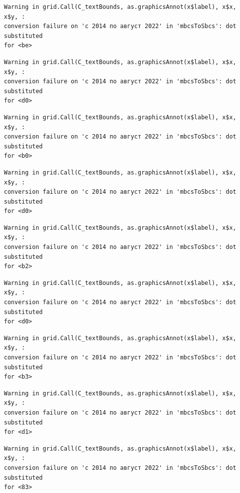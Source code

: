 \documentclass[
  letterpaper,
  DIV=11,
  numbers=noendperiod]{scrartcl}
\begin{document}
\begin{verbatim}
Warning in grid.Call(C_textBounds, as.graphicsAnnot(x$label), x$x, x$y, :
conversion failure on 'с 2014 по август 2022' in 'mbcsToSbcs': dot substituted
for <be>
\end{verbatim}

\begin{verbatim}
Warning in grid.Call(C_textBounds, as.graphicsAnnot(x$label), x$x, x$y, :
conversion failure on 'с 2014 по август 2022' in 'mbcsToSbcs': dot substituted
for <d0>
\end{verbatim}

\begin{verbatim}
Warning in grid.Call(C_textBounds, as.graphicsAnnot(x$label), x$x, x$y, :
conversion failure on 'с 2014 по август 2022' in 'mbcsToSbcs': dot substituted
for <b0>
\end{verbatim}

\begin{verbatim}
Warning in grid.Call(C_textBounds, as.graphicsAnnot(x$label), x$x, x$y, :
conversion failure on 'с 2014 по август 2022' in 'mbcsToSbcs': dot substituted
for <d0>
\end{verbatim}

\begin{verbatim}
Warning in grid.Call(C_textBounds, as.graphicsAnnot(x$label), x$x, x$y, :
conversion failure on 'с 2014 по август 2022' in 'mbcsToSbcs': dot substituted
for <b2>
\end{verbatim}

\begin{verbatim}
Warning in grid.Call(C_textBounds, as.graphicsAnnot(x$label), x$x, x$y, :
conversion failure on 'с 2014 по август 2022' in 'mbcsToSbcs': dot substituted
for <d0>
\end{verbatim}

\begin{verbatim}
Warning in grid.Call(C_textBounds, as.graphicsAnnot(x$label), x$x, x$y, :
conversion failure on 'с 2014 по август 2022' in 'mbcsToSbcs': dot substituted
for <b3>
\end{verbatim}

\begin{verbatim}
Warning in grid.Call(C_textBounds, as.graphicsAnnot(x$label), x$x, x$y, :
conversion failure on 'с 2014 по август 2022' in 'mbcsToSbcs': dot substituted
for <d1>
\end{verbatim}

\begin{verbatim}
Warning in grid.Call(C_textBounds, as.graphicsAnnot(x$label), x$x, x$y, :
conversion failure on 'с 2014 по август 2022' in 'mbcsToSbcs': dot substituted
for <83>
\end{verbatim}
\end{document}
